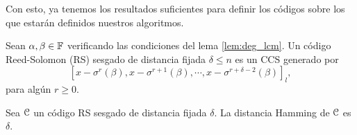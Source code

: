 Con esto, ya tenemos los resultados suficientes para definir los códigos sobre los que estarán definidos nuestros algoritmos.

\begin{definition}
\label{def:RS_code}
    Sean \(\alpha, \beta \in \mathbb{F}\) verificando las condiciones del lema \ref{lem:deg_lcm}. Un código Reed-Solomon (RS) sesgado de distancia fijada \(\delta \leq n\) es un CCS generado por \[{[x - \sigma^r(\beta), x - \sigma^{r+1}(\beta), \cdots, x - \sigma^{r + \delta -2}(\beta)]}_l,\] para algún \(r \geq 0\).
\end{definition}

\begin{theorem}
\label{th:distance}
    Sea \(\mathcal{C}\) un código RS sesgado de distancia fijada \(\delta\). La distancia Hamming de \(\mathcal{C}\) es \(\delta\).
\end{theorem}


